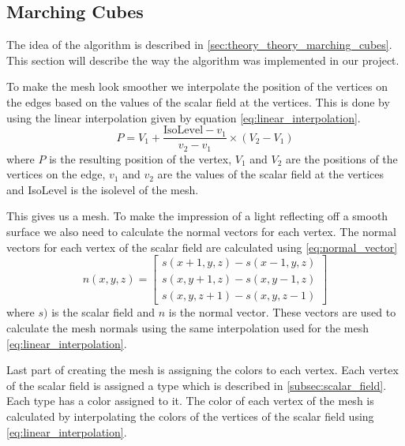\subsection{Marching Cubes} \label{subsec:marching_cubes}
The idea of the algorithm is described in \autoref{sec:theory_theory_marching_cubes}.
This section will describe the way the algorithm was implemented in our project.

To make the mesh look smoother we interpolate the position of the vertices on the edges based on the values of the scalar field at the vertices.
This is done by using the linear interpolation given by equation \autoref{eq:linear_interpolation}.
\begin{equation}
  \label{eq:linear_interpolation}
  P = V_1 + \frac{\text{IsoLevel} - v_1}{v_2 - v_1} \times (V_2 - V_1)
\end{equation}
where $P$ is the resulting position of the vertex, $V_1$ and $V_2$ are the positions of the vertices on the edge, $v_1$ and $v_2$ are the values of the scalar field at the vertices and IsoLevel is the isolevel of the mesh.
  
This gives us a mesh.
To make the impression of a light reflecting off a smooth surface we also need to calculate the normal vectors for each vertex.
The normal vectors for each vertex of the scalar field are calculated using \autoref{eq:normal_vector}
\begin{equation}
    \label{eq:normal_vector}
    n(x, y, z) = \begin{bmatrix}
        s(x + 1, y, z) - s(x - 1, y, z) \\
        s(x, y + 1, z) - s(x, y - 1, z) \\
        s(x, y, z + 1) - s(x, y, z - 1)
      \end{bmatrix}
\end{equation}
where $s)$ is the scalar field and $n$ is the normal vector.
These vectors are used to calculate the mesh normals using the same interpolation used for the mesh \autoref{eq:linear_interpolation}.

Last part of creating the mesh is assigning the colors to each vertex.
Each vertex of the scalar field is assigned a type which is described in \autoref{subsec:scalar_field}.
Each type has a color assigned to it.
The color of each vertex of the mesh is calculated by interpolating the colors of the vertices of the scalar field using \autoref{eq:linear_interpolation}.

